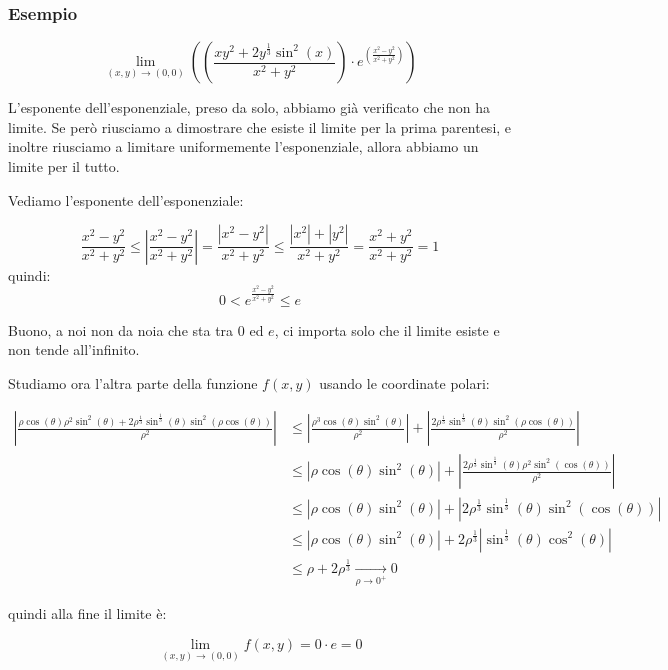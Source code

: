 \subsubsection*{Esempio}

\[
    \lim_{ (x,y) \to (0,0) } \left( \left( \frac{xy^{2}+2y^{ \frac{1}{3}}\sin^{2}(x)}{x^{2}+y^{2}}\right) \cdot e^{ \left(\frac{x^{2}-y^{2}}{x^{2}+y^{2}}\right)} \right)
\]

L'esponente dell'esponenziale, preso da solo, abbiamo già verificato che non ha limite. Se però riusciamo a dimostrare che esiste il limite per la prima parentesi, e inoltre riusciamo a limitare uniformemente l'esponenziale, allora abbiamo un limite per il tutto.

Vediamo l'esponente dell'esponenziale:

\[
    \frac{x^{2}-y^{2}}{x^{2}+y^{2}} \le \left|\frac{x^{2}-y^{2}}{x^{2}+y^{2}}\right| = \frac{\left|x^{2}-y^{2}\right|}{x^{2}+y^{2}} \le \frac{\left|x^{2}\right|+\left|y^{2}\right|}{x^{2}+y^{2}} = \frac{x^{2}+y^{2}}{x^{2}+y^{2}} = 1
\]
quindi:
\[
    0 < e ^{ \frac{x^{2}-y^{2}}{x^{2}+y^{2}}} \le e
\]

Buono, a noi non da noia che sta tra \(0\) ed \(e\), ci importa solo che il limite esiste e non tende all'infinito.

Studiamo ora l'altra parte della funzione \(f(x,y)\) usando le coordinate polari:

\begin{align*}
    \left| \frac{\rho\cos(\theta) \rho^{2}\sin^{2}(\theta) + 2 \rho^{\frac{1}{3}}\sin^{\frac{1}{3}}(\theta) \sin^{2}(\rho\cos(\theta))}{\rho^{2}}\right| & \le \left| \frac{\rho^{3}\cos(\theta)\sin^{2}(\theta)}{\rho^{2}}\right| + \left|\frac{2 \rho^{\frac{1}{3}}\sin^{\frac{1}{3}}(\theta) \sin^{2}(\rho\cos(\theta)) }{\rho^{2}}\right| \\
                                                                                                                                                         & \le \left| \rho\cos(\theta) \sin ^{2}(\theta)\right| + \left|\frac{2 \rho^{\frac{1}{3}} \sin^{\frac{1}{3}}(\theta) \rho^2\sin^{2}(\cos(\theta)) }{\rho^{2}}\right|                 \\
                                                                                                                                                         & \le \left| \rho\cos(\theta) \sin ^{2}(\theta)\right| + \left| 2 \rho^{\frac{1}{3}} \sin^{\frac{1}{3}}(\theta) \sin^{2}(\cos(\theta)) \right|                                       \\
                                                                                                                                                         & \le \left| \rho\cos(\theta) \sin ^{2}(\theta)\right| + 2 \rho^{ \frac{1}{3}} \left| \sin^{\frac{1}{3}}(\theta) \cos^{2}(\theta)\right|                                             \\
                                                                                                                                                         & \le \rho + 2 \rho^{ \frac{1}{3}} \xrightarrow[\rho \to 0^+]{} 0
\end{align*}

quindi alla fine il limite è:

\[
    \lim_{ (x,y) \to (0,0) } f(x,y) = 0 \cdot e = 0
\]
